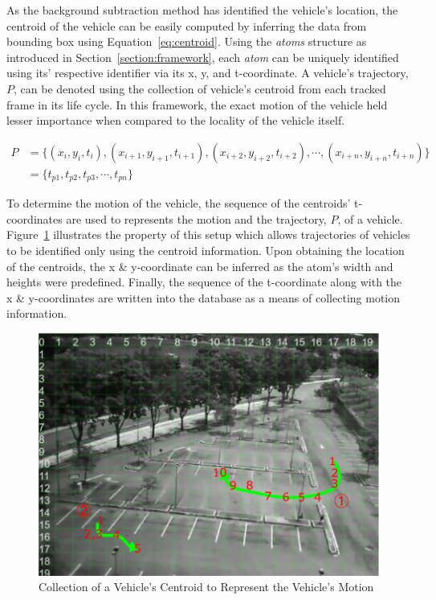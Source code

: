 As the background subtraction method has identified the vehicle's location, the centroid of the vehicle can be easily computed by inferring the data from bounding box using Equation~\ref{eq:centroid}. Using the \emph{atoms} structure as introduced in Section~\ref{section:framework}, each \emph{atom} can be uniquely identified using its' respective identifier via its x, y, and t-coordinate. A vehicle's trajectory, $P$, can be denoted using the collection of vehicle's centroid from each tracked frame in its life cycle. In this framework, the exact motion of the vehicle held lesser importance when compared to the locality of the vehicle itself.

\begin{align}
    P &= \{ (x_i, y_i, t_i), (x_{i+1}, y_{i+1}, t_{i+1}), (x_{i+2}, y_{i+2}, t_{i+2}), \dotsb,(x_{i+n}, y_{i+n}, t_{i+n})\}  \nonumber \\
      &= \{ t_{p1}, t_{p2}, t_{p3}, \dotsb, t_{pn}\}
\end{align}


To determine the motion of the vehicle, the sequence of the centroids' t-coordinates are used to represents the motion and the trajectory, $P$, of a vehicle. Figure~\ref{fig:motionExample} illustrates the property of this setup which allows trajectories of vehicles to be identified only using the centroid information. Upon obtaining the location of the centroids, the x \& y-coordinate can be inferred as the atom's width and heights were predefined. Finally, the sequence of the t-coordinate along with the x \& y-coordinates are written into the database as a means of collecting motion information.

\begin{figure}[hbt!]\centering
\includegraphics[width=.9\textwidth]{image/general/trajectorysample2.png}
\caption{Collection of a Vehicle's Centroid to Represent the Vehicle's Motion}
\label{fig:motionExample}
\end{figure}

